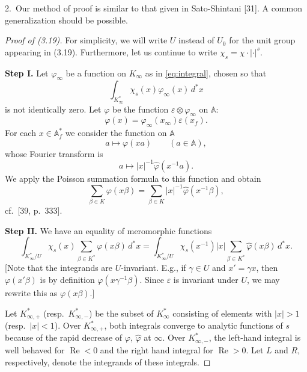 \documentclass[12pt,a4paper]{article}
\theoremstyle{plain}
\theoremstyle{definition}
\DeclareMathOperator{\Res}{Re}
\newcommand{\A}{\mathbb{A}}
\begin{document}
2.~Our method of proof is similar to that given in Sato-Shintani [31]. A common generalization should be possible.

\begin{proof}[Proof of (3.19)]
For simplicity, we will write $U$ instead of $U_0$ for the unit group appearing in (3.19). Furthermore, let us continue to write $\chi_s=\chi\cdot|\cdot|^s$.

\textbf{Step I.} Let $\varphi_{\infty}$ be a function on $K_{\infty}$ as in \eqref{eq:integral}, chosen so that
\[
\int_{K_{\infty}^*}\chi_s(x)\varphi_{\infty}(x)\,d^*x
\]
is not identically zero. Let $\varphi$ be the function $\varepsilon\otimes\varphi_{\infty}$ on $\A$:
\[
\varphi(x)=\varphi_{\infty}(x_{\infty})\varepsilon(x_f).
\]
For each $x\in\A_f^*$ we consider the function on $\A$
\[
a\mapsto\varphi(xa)\qquad(a\in\A),
\]
whose Fourier transform is
\[
a\mapsto|x|^{-1}\hat{\varphi}(x^{-1}a).
\]
We apply the Poisson summation formula to this function and obtain
\begin{equation}\label{eq:poisson}
\sum_{\beta\in K}\varphi(x\beta)=\sum_{\beta\in K}|x|^{-1}\hat{\varphi}(x^{-1}\beta),
\end{equation}
cf.~[39, p.~333].

\textbf{Step II.} We have an equality of meromorphic functions
\begin{equation}\label{eq:step2}
\int_{K_{\infty}^*/U}\chi_s(x)\sum_{\beta\in K^*}\varphi(x\beta)\,d^*x=\int_{K_{\infty}^*/U}\chi_s(x^{-1})|x|\sum_{\beta\in K^*}\hat{\varphi}(x\beta)\,d^*x.
\end{equation}
[Note that the integrands are $U$-invariant. E.g., if $\gamma\in U$ and $x'=\gamma x$, then $\varphi(x'\beta)$ is by definition $\varphi(x\gamma^{-1}\beta)$. Since $\varepsilon$ is invariant under $U$, we may rewrite this as $\varphi(x\beta)$.]

Let $K_{\infty,+}^*$ (resp.~$K_{\infty,-}^*$) be the subset of $K_{\infty}^*$ consisting of elements with $|x|>1$ (resp.~$|x|<1$). Over $K_{\infty,+}^*$, both integrals converge to analytic functions of $s$ because of the rapid decrease of $\varphi$, $\hat{\varphi}$ at $\infty$. Over $K_{\infty,-}^*$, the left-hand integral is well behaved for $\Res<0$ and the right hand integral for $\Res>0$. Let $L$ and $R$, respectively, denote the integrands of these integrals.


\end{proof}
\end{document}
